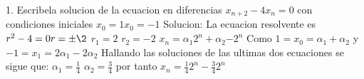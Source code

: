 \documentclass{article}
\begin{document}
1. Escribela solucion de la ecuacion en diferencias $x_{n+2}-4x_n=0$
con condiciones iniciales $x_{0}=1  x_{0}=-1$
Solucion:
La ecuacion resolvente es $r^{2}-4=0 r=\pm\2$ 
$r_1=2$ $r_2=-2$
$x_n=\alpha_1{2^n}+\alpha_2{-2^n}$
Como $1=x_0=\alpha_1+\alpha_2$  y $-1=x_1=2\alpha_1-2\alpha_2$
Hallando las soluciones de las ultimas dos ecuaciones se sigue que:
$\alpha_1=\frac{1}{4}$ $\alpha_2=\frac{3}{4}$
por tanto $x_n=\frac{1}{4}2^n-\frac{3}{4}2^n$
\end{document}
